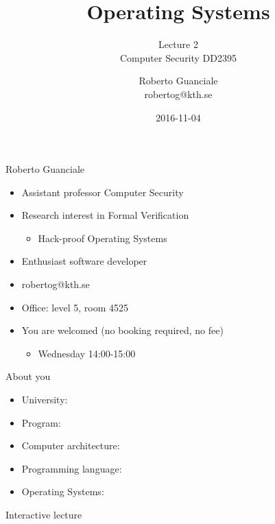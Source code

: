 \documentclass{beamer}
\title{Operating Systems}
\subtitle{Lecture 2 \\ Computer Security DD2395}
\author[R. Guanciale]{
  Roberto Guanciale\\
  robertog@kth.se
}
\date{2016-11-04}
\begin{document}
\maketitle

\begin{frame}{Roberto Guanciale}
  \begin{itemize}
    \item Assistant professor \alert{Computer Security}
    \item Research interest in \alert{Formal Verification}
      \begin{itemize}
        \item Hack-proof Operating Systems
      \end{itemize}
    \item Enthusiast software developer
    \item robertog@kth.se
    \item Office: level 5, room 4525
    \item You are welcomed (no booking required, no fee)
    \begin{itemize}
      \item Wednesday 14:00-15:00
    \end{itemize}
  \end{itemize}
\end{frame}

\begin{frame}{About you}
  \begin{itemize}
    \item University:
    \item Program:
    \item Computer architecture:
    \item Programming language:
    \item Operating Systems:
  \end{itemize}
\end{frame}

\begin{frame}{Interactive lecture}
\end{frame}
\end{document}
